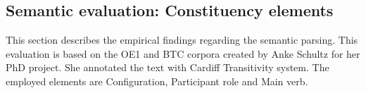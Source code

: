 \subsection{Semantic evaluation: Constituency elements}
This section describes the empirical findings regarding the semantic parsing. This evaluation is based on the OE1 and BTC corpora created by Anke Schultz for her PhD project. She annotated the text with Cardiff Transitivity system. The employed elements are Configuration, Participant role and Main verb.

\begin{table}[!ht]
    \caption{The evaluation statistics for the main semantic elements}
    \label{tab:configuration-elements}
\end{table}

